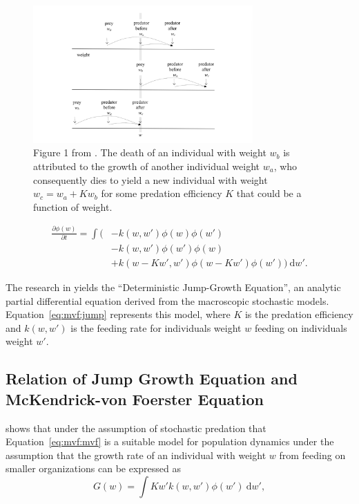 \documentclass[../main.tex]{subfiles}
\begin{document}
  \begin{figure}
    \centering
    \includegraphics[width=0.75\textwidth]{img/stochastic_predation.png}
    \caption{Figure 1 from \cite{datta2010}. The death of an individual with weight $w_b$ is attributed to the growth of another individual weight $w_a$, who consequently dies to yield a new individual with weight $w_c = w_a + K w_b$ for some predation efficiency $K$ that could be a function of weight. \label{fig:mvf:predation}}
  \end{figure}

  \begin{align}\label{eq:mvf:jump}
    \frac{\partial \phi(w)}{\partial t}
    = \int ( &- k(w, w') \phi(w)\phi(w') \nonumber \\
    & - k(w, w')\phi(w')\phi(w) \nonumber \\
    & + k(w - Kw', w')\phi(w - Kw')\phi(w')) \: \mathrm{d}w'.
  \end{align}

  The research in \cite{datta2010} yields the ``Deterministic Jump-Growth Equation'', an analytic partial differential equation derived from the macroscopic stochastic models. Equation~\ref{eq:mvf:jump} represents this model, where $K$ is the predation efficiency and $k(w, w')$ is the feeding rate for individuals weight $w$ feeding on individuals weight $w'$.

  \subsection{Relation of Jump Growth Equation and McKendrick-von Foerster Equation}\label{sec:mvf:relation}
  \cite{law2009} shows that under the assumption of stochastic predation that Equation~\ref{eq:mvf:mvf} is a suitable model for population dynamics under the assumption that the growth rate of an individual with weight $w$ from feeding on smaller organizations can be expressed as
  \begin{equation}
    G(w) = \int K w' k(w, w') \phi(w') \: \mathrm{d}w',
  \end{equation}
\end{document}
